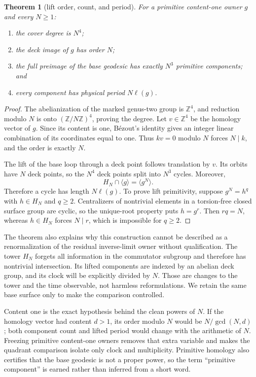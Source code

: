 \documentclass[11pt]{article}
\newtheorem{theorem}{Theorem}[section]
\theoremstyle{definition}
\theoremstyle{remark}
\newcommand{\ZZ}{\mathbb Z}
\begin{document}
\begin{theorem}[lift order, count, and period]\label{thm:lifts}
For a primitive content-one owner $g$ and every $N\geq1$:
\begin{enumerate}[label=(\roman*)]
\item the cover degree is $N^4$;
\item the deck image of $g$ has order $N$;
\item the full preimage of the base geodesic has exactly $N^3$ primitive components; and
\item every component has physical period $N\ell(g)$.
\end{enumerate}
\end{theorem}

\begin{proof}
The abelianization of the marked genus-two group is $\ZZ^4$, and reduction modulo $N$ is onto $(\ZZ/N\ZZ)^4$, proving the degree. Let $v\in\ZZ^4$ be the homology vector of $g$. Since its content is one, B\'ezout's identity gives an integer linear combination of its coordinates equal to one. Thus $kv=0$ modulo $N$ forces $N\mid k$, and the order is exactly $N$.

The lift of the base loop through a deck point follows translation by $v$. Its orbits have $N$ deck points, so the $N^4$ deck points split into $N^3$ cycles. Moreover,
\[
H_N\cap\langle g\rangle=\langle g^N\rangle.
\]
Therefore a cycle has length $N\ell(g)$. To prove lift primitivity, suppose $g^N=h^q$ with $h\in H_N$ and $q\geq2$. Centralizers of nontrivial elements in a torsion-free closed surface group are cyclic, so the unique-root property puts $h=g^r$. Then $rq=N$, whereas $h\in H_N$ forces $N\mid r$, which is impossible for $q\geq2$.
\end{proof}

The theorem also explains why this construction cannot be described as a renormalization of the residual inverse-limit owner without qualification. The tower $H_N$ forgets all information in the commutator subgroup and therefore has nontrivial intersection. Its lifted components are indexed by an abelian deck group, and its clock will be explicitly divided by $N$. Those are changes to the tower and the time observable, not harmless reformulations. We retain the same base surface only to make the comparison controlled.

Content one is the exact hypothesis behind the clean powers of $N$. If the homology vector had content $d>1$, its order modulo $N$ would be $N/\gcd(N,d)$; both component count and lifted period would change with the arithmetic of $N$. Freezing primitive content-one owners removes that extra variable and makes the quadrant comparison isolate only clock and multiplicity. Primitive homology also certifies that the base geodesic is not a proper power, so the term ``primitive component'' is earned rather than inferred from a short word.
\end{document}
